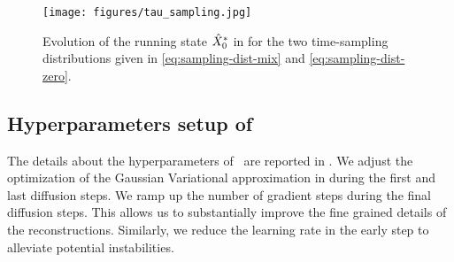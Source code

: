 \begin{table} 
    \centering 
    \caption{LPIPS on the \ffhq\ dataset for the two time-sampling distributions given in \eqref{eq:sampling-dist-mix} and \eqref{eq:sampling-dist-zero}. We use $R = 4$ Gibbs steps for the phase retrieval task.}
    \label{table:sampling-comparison}
\end{table}
\begin{figure}
\centering 
\texttt{[image: figures/tau\_sampling.jpg]}
\caption{Evolution of the running state $\hat{X}^* _0$ in  for the two time-sampling distributions given in \eqref{eq:sampling-dist-mix} and \eqref{eq:sampling-dist-zero}. }
\label{fig:sampling-comparison}
\end{figure}

\subsection{Hyperparameters setup of \algo}
\label{apdx-sec:hyperparameters}
The details about the hyperparameters of \algo\ are reported in .
We adjust the optimization of the Gaussian Variational approximation in  during the first and last diffusion steps.
We ramp up the number of gradient steps during the final diffusion steps.
This allows us to substantially improve the fine grained details of the reconstructions. 
Similarly, we reduce the learning rate in the early step to alleviate potential instabilities.


